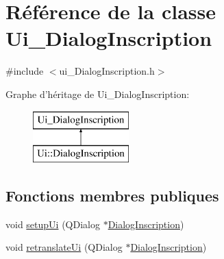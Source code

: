 \hypertarget{class_ui___dialog_inscription}{\section{Référence de la classe Ui\-\_\-\-Dialog\-Inscription}
\label{class_ui___dialog_inscription}
}


{\ttfamily \#include $<$ui\-\_\-\-Dialog\-Inscription.\-h$>$}

Graphe d'héritage de Ui\-\_\-\-Dialog\-Inscription\-:\begin{figure}[H]
\begin{center}
\leavevmode
\includegraphics[height=2.000000cm]{class_ui___dialog_inscription}
\end{center}
\end{figure}
\subsection*{Fonctions membres publiques}
\begin{DoxyCompactItemize}
\item 
void \hyperlink{class_ui___dialog_inscription_aac8f38192f3e2691f410ae201df0d742}{setup\-Ui} (Q\-Dialog $\ast$\hyperlink{class_dialog_inscription}{Dialog\-Inscription})
\item 
void \hyperlink{class_ui___dialog_inscription_ae1af8d7775047088b4a14746e457b66e}{retranslate\-Ui} (Q\-Dialog $\ast$\hyperlink{class_dialog_inscription}{Dialog\-Inscription})
\end{DoxyCompactItemize}
